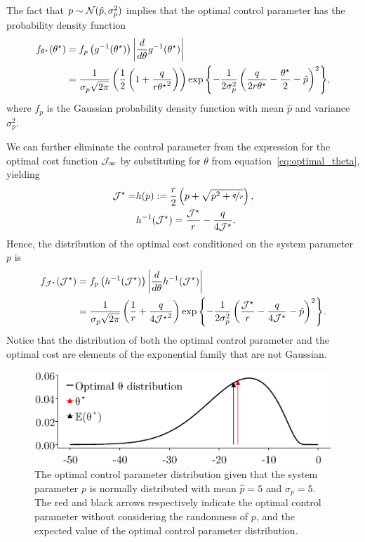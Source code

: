 %
The fact that $p \sim \mathcal{N}(\hat{p}, \sigma_p^2)$ implies that the optimal
control parameter has the probability density function
%
\begin{align*} 
    f_{\theta^\star}(\theta^\star) &= f_p\left(g^{-1}(\theta^\star)\right)
        \left|{\frac{d}{d\theta}g^{-1}(\theta^\star)}\right| \\ 
        &= \frac{1}{\sigma_p
        \sqrt{2\pi}}\left(\frac{1}{2}\left(1+\frac{q}{r{\theta^\star}^2}\right)\right)
        \exp{\left\{-\frac{1}{2\sigma_p^2}\left(
        \frac{q}{2r\theta^\star} - \frac{\theta^\star}{2} - \hat{p}
        \right)^2\right\}}, 
\end{align*}
%
where $f_p$ is the Gaussian probability density function with mean $\hat{p}$ and
variance $\sigma_p^2$. 

We can further eliminate the control parameter from the
expression for the optimal cost function $\mathcal{J}_\infty$ by
substituting for $\theta$ from
equation~\eqref{eq:optimal_theta}, yielding 
%
\begin{align*}
\mathcal{J}^\star = &h(p) := \frac{r}{2}\left( p +
\sqrt{p^2 + \nicefrac{q}{r}} \right), \\
&h^{-1}(\mathcal{J}^\star) = \frac{\mathcal{J}^\star}{r} -
\frac{q}{4\mathcal{J}^\star}.
\end{align*}
%
Hence, the distribution of the optimal cost conditioned on the system parameter
$p$ is 
%
\begin{align*} 
    f_{\mathcal{J}^\star}(\mathcal{J}^\star) &=f_p\left(h^{-1}(\mathcal{J}^\star)\right)
        \left|{\frac{d}{d\theta}h^{-1}(\mathcal{J}^\star)}\right| \\
        &= \frac{1}{\sigma_p
        \sqrt{2\pi}}\left(\frac{1}{r} + \frac{q}{4{\mathcal{J}^\star}^2}\right)
        \exp{\left\{ -\frac{1}{2\sigma_p^2} \left(
        \frac{\mathcal{J}^\star}{r} - \frac{q}{4\mathcal{J}^\star} -
        \hat{p}\right)^2\right\}}.
\end{align*}
%
Notice that the distribution of both the optimal control parameter and the
optimal cost are elements of the exponential family that are not Gaussian. 

\begin{figure}[tb]
  \centering
  \includegraphics[width=0.7\linewidth]{./figures/optimal-dist.eps}
  \caption{The optimal control parameter distribution given that the system
  parameter $p$ is normally distributed with mean $\hat{p} = 5$ and $\sigma_p
  = 5$. The red and black arrows respectively indicate the optimal control
  parameter without considering the randomness of $p$, and the expected value
  of the optimal control parameter distribution.}
  \label{fig:optimal_dist}
\end{figure}


